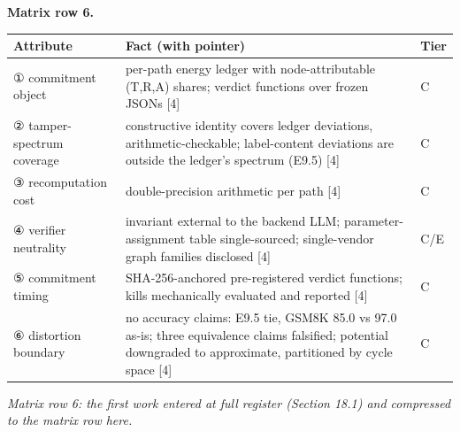 \documentclass[11pt]{article}
\begin{document}
\noindent \textbf{Matrix row 6.}\par
\begingroup\footnotesize
\noindent\begin{tabularx}{\textwidth}{@{}>{\raggedright\arraybackslash}p{} >{\raggedright\arraybackslash}X >{\raggedright\arraybackslash}p{}@{}}
\toprule
\textbf{Attribute} & \textbf{Fact (with pointer)} & \textbf{Tier} \\
\midrule
① commitment object & per-path energy ledger with node-attributable (T,R,A) shares; verdict functions over frozen JSONs [4] & C \\
② tamper-spectrum coverage & constructive identity covers ledger deviations, arithmetic-checkable; label-content deviations are outside the ledger's spectrum (E9.5) [4] & C \\
③ recomputation cost & double-precision arithmetic per path [4] & C \\
④ verifier neutrality & invariant external to the backend LLM; parameter-assignment table single-sourced; single-vendor graph families disclosed [4] & C/E \\
⑤ commitment timing & SHA-256-anchored pre-registered verdict functions; kills mechanically evaluated and reported [4] & C \\
⑥ distortion boundary & no accuracy claims: E9.5 tie, GSM8K 85.0 vs 97.0 as-is; three equivalence claims falsified; potential downgraded to approximate, partitioned by cycle space [4] & C \\
\bottomrule
\end{tabularx}
\endgroup
\begin{center}\emph{Matrix row 6: the first work entered at full register (Section 18.1) and compressed to the matrix row here.}\end{center}
\end{document}
